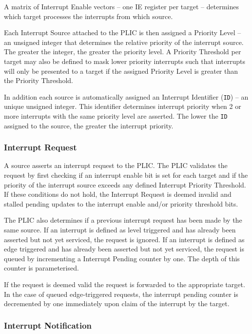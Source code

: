 A matrix of Interrupt Enable vectors -- one IE register per target --
determines which target processes the interrupts from which source.

Each Interrupt Source attached to the PLIC is then assigned a Priority
Level -- an unsigned integer that determines the relative priority of
the interrupt source. The greater the integer, the greater the priority
level. A Priority Threshold per target may also be defined to mask lower
priority interrupts such that interrupts will only be presented to a
target if the assigned Priority Level is greater than the Priority Threshold.

In addition each source is automatically assigned an Interrupt Identifier
(\texttt{ID}) -- an unique unsigned integer. This identifier determines
interrupt priority when 2 or more interrupts with the same priority
level are asserted. The lower the \texttt{ID} assigned to the source,
the greater the interrupt priority.

\subsubsection{Interrupt Request}

A source asserts an interrupt request to the PLIC. The PLIC validates
the request by first checking if an interrupt enable bit is set for each
target and if the priority of the interrupt source exceeds any defined
Interrupt Priority Threshold. If these conditions do not hold, the
Interrupt Request is deemed invalid and stalled pending updates to the interrupt enable and/or priority threshold bits. 

The PLIC also determines if a previous interrupt request has been made
by the same source. If an interrupt is defined as level triggered and
has already been asserted but not yet serviced, the request is ignored.
If an interrupt is defined as edge triggered and has already been
asserted but not yet serviced, the request is queued by incrementing a
Interrupt Pending counter by one. The depth of this counter is
parameterised.

If the request is deemed valid the request is forwarded to the
appropriate target. In the case of queued edge-triggered requests, the
interrupt pending counter is decremented by one immediately upon claim of the interrupt by the target.

\subsubsection{Interrupt Notification}

